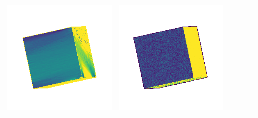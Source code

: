 \begin{tabularx}{\linewidth}{@{}Y@{}Y@{}Y@{}Y@{}Y@{}Y@{}}
\includegraphics[width=\linewidth]{semisynthetic/20150514_0_yu_err.png} &
\includegraphics[width=\linewidth]{semisynthetic/20150514_0_dpsn_err.png} &

\end{tabularx}
